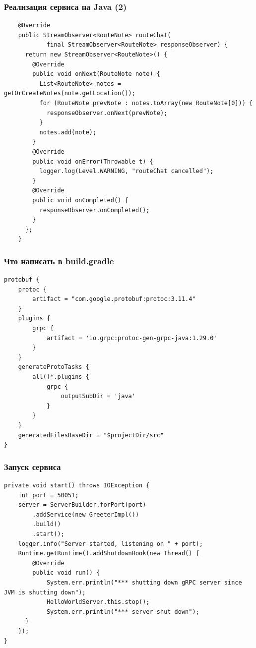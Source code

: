 \documentclass[xetex,mathserif,serif]{beamer}
\begin{document}
    \begin{frame}[fragile]
        \frametitle{Реализация сервиса на Java (2)}
        \begin{scriptsize}
            \begin{verbatim}
    @Override
    public StreamObserver<RouteNote> routeChat(
            final StreamObserver<RouteNote> responseObserver) {
      return new StreamObserver<RouteNote>() {
        @Override
        public void onNext(RouteNote note) {
          List<RouteNote> notes = getOrCreateNotes(note.getLocation());
          for (RouteNote prevNote : notes.toArray(new RouteNote[0])) {
            responseObserver.onNext(prevNote);
          }
          notes.add(note);
        }
        @Override
        public void onError(Throwable t) {
          logger.log(Level.WARNING, "routeChat cancelled");
        }
        @Override
        public void onCompleted() {
          responseObserver.onCompleted();
        }
      };
    }
            \end{verbatim}
        \end{scriptsize}
    \end{frame}

    \begin{frame}[fragile]
        \frametitle{Что написать в build.gradle}
        \begin{small}
            \begin{verbatim}
protobuf {
    protoc {
        artifact = "com.google.protobuf:protoc:3.11.4"
    }
    plugins {
        grpc {
            artifact = 'io.grpc:protoc-gen-grpc-java:1.29.0'
        }
    }
    generateProtoTasks {
        all()*.plugins {
            grpc {
                outputSubDir = 'java'
            }
        }
    }
    generatedFilesBaseDir = "$projectDir/src"
}
            \end{verbatim}
        \end{small}
    \end{frame}

    \begin{frame}[fragile]
        \frametitle{Запуск сервиса}
        \begin{footnotesize}
            \begin{verbatim}
private void start() throws IOException {
    int port = 50051;
    server = ServerBuilder.forPort(port)
        .addService(new GreeterImpl())
        .build()
        .start();
    logger.info("Server started, listening on " + port);
    Runtime.getRuntime().addShutdownHook(new Thread() {
        @Override
        public void run() {
            System.err.println("*** shutting down gRPC server since JVM is shutting down");
            HelloWorldServer.this.stop();
            System.err.println("*** server shut down");
      }
    });
}
            \end{verbatim}
        \end{footnotesize}
    \end{frame}
\end{document}
